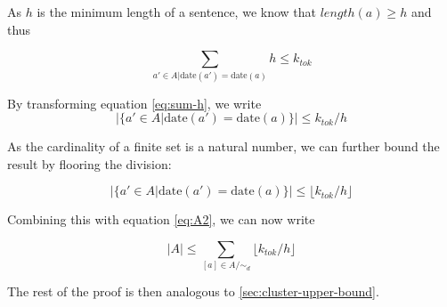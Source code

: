 \documentclass[a4paper,BCOR=10mm]{report}
\numberwithin{lemma}{chapter}
\numberwithin{definition}{chapter}
\begin{document}
\begin{appendices}
As $h$ is the minimum length of a sentence, we know that $\mathit{length}(a) \geq h$ and thus

\begin{equation}
\sum_{ a' \in A | \text{date}(a') = \text{date}(a)} h \leq k_{tok} \label{eq:sum-h}
\end{equation}

By transforming equation \ref{eq:sum-h}, we write
\begin{equation}
|\{ a' \in A | \text{date}(a') = \text{date}(a)\}| \leq k_{tok}/h
\end{equation}

As the cardinality of a finite set is a natural number, we can further bound the result by flooring the division:

\begin{equation}
|\{ a' \in A | \text{date}(a') = \text{date}(a)\}| \leq \lfloor k_{tok}/h \rfloor
\end{equation}


Combining this with equation \ref{eq:A2}, we can now write

\begin{equation}
|A| \leq \sum_{[a] \in A/\sim_d} \lfloor k_{tok}/h \rfloor
\end{equation}

The rest of the proof is then analogous to \ref{sec:cluster-upper-bound}.




\end{appendices}
\end{document}
